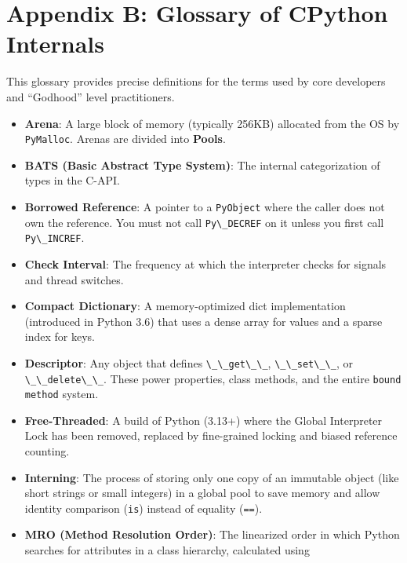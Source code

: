 \hypertarget{appendix-b-glossary-of-cpython-internals}{%
\chapter{Appendix B: Glossary of CPython
Internals}\label{appendix-b-glossary-of-cpython-internals}}

This glossary provides precise definitions for the terms used by core
developers and ``Godhood'' level practitioners.

\begin{itemize}
\tightlist
\item
  \textbf{Arena}: A large block of memory (typically 256KB) allocated
  from the OS by \passthrough{\lstinline!PyMalloc!}. Arenas are divided
  into \textbf{Pools}.
\item
  \textbf{BATS (Basic Abstract Type System)}: The internal
  categorization of types in the C-API.
\item
  \textbf{Borrowed Reference}: A pointer to a
  \passthrough{\lstinline!PyObject!} where the caller does not own the
  reference. You must not call \passthrough{\lstinline!Py\_DECREF!} on
  it unless you first call \passthrough{\lstinline!Py\_INCREF!}.
\item
  \textbf{Check Interval}: The frequency at which the interpreter checks
  for signals and thread switches.
\item
  \textbf{Compact Dictionary}: A memory-optimized dict implementation
  (introduced in Python 3.6) that uses a dense array for values and a
  sparse index for keys.
\item
  \textbf{Descriptor}: Any object that defines
  \passthrough{\lstinline!\_\_get\_\_!},
  \passthrough{\lstinline!\_\_set\_\_!}, or
  \passthrough{\lstinline!\_\_delete\_\_!}. These power properties,
  class methods, and the entire \passthrough{\lstinline!bound method!}
  system.
\item
  \textbf{Free-Threaded}: A build of Python (3.13+) where the Global
  Interpreter Lock has been removed, replaced by fine-grained locking
  and biased reference counting.
\item
  \textbf{Interning}: The process of storing only one copy of an
  immutable object (like short strings or small integers) in a global
  pool to save memory and allow identity comparison
  (\passthrough{\lstinline!is!}) instead of equality
  (\passthrough{\lstinline!==!}).
\item
  \textbf{MRO (Method Resolution Order)}: The linearized order in which
  Python searches for attributes in a class hierarchy, calculated using

\end{itemize}
